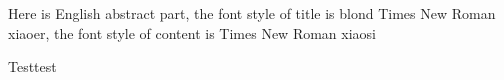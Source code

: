 \begin{eabstract}
	Here is English abstract part, the font style of title is blond Times New Roman xiaoer, the font style of content is Times New Roman xiaosi
	
	Testtest
\end{eabstract}



